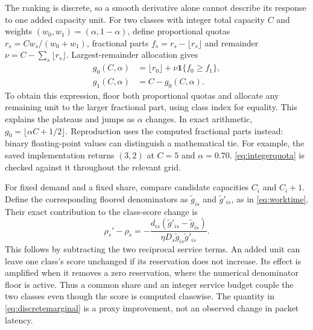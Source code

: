 \documentclass{IEEEoj}
\begin{document}
The ranking is discrete, so a smooth derivative alone cannot describe its
response to one added capacity unit. For two classes with integer total
capacity $C$ and weights $(w_0,w_1)=(\alpha,1-\alpha)$, define proportional
quotas $r_s=Cw_s/(w_0+w_1)$, fractional parts $f_s=r_s-\lfloor r_s\rfloor$
and remainder $\nu=C-\sum_s\lfloor r_s\rfloor$. Largest-remainder allocation gives
\begin{equation}
\begin{aligned}
 g_0(C,\alpha)&=\lfloor r_0\rfloor+\nu\mathbf1\{f_0\ge f_1\},\\
 g_1(C,\alpha)&=C-g_0(C,\alpha).
\end{aligned}
\label{eq:integerquota}
\end{equation}
To obtain this expression, floor both proportional quotas and allocate any
remaining unit to the larger fractional part, using class index for equality.
This explains the plateaus and jumps as $\alpha$ changes. In exact arithmetic,
$g_0=\lfloor\alpha C+1/2\rfloor$. Reproduction uses the computed fractional
parts instead: binary floating-point values can distinguish a mathematical
tie. For example, the saved implementation returns $(3,2)$ at $C=5$ and
$\alpha=0.70$. \eqref{eq:integerquota} is checked against it throughout the relevant grid.

For fixed demand and a fixed share, compare candidate capacities $C_i$ and
$C_i+1$. Define the corresponding floored denominators as
$\widetilde g_{is}$ and $\widetilde g'_{is}$, as in
\eqref{eq:worktime}. Their exact contribution to the class-score change is
\begin{equation}
 \rho_s'-\rho_s
 =-\frac{d_{is}(\widetilde g'_{is}-\widetilde g_{is})}
 {\eta D_s\widetilde g_{is}\widetilde g'_{is}}.
 \label{eq:discretemarginal}
\end{equation}
This follows by subtracting the two reciprocal service terms. An added unit
can leave one class's score unchanged if its reservation does not increase.
Its effect is amplified when it removes a zero reservation, where the numerical
denominator floor is active. Thus a common share and an integer service budget
couple the two classes even though the score is computed classwise. The
quantity in \eqref{eq:discretemarginal} is a proxy improvement, not an observed
change in packet latency.
\end{document}
